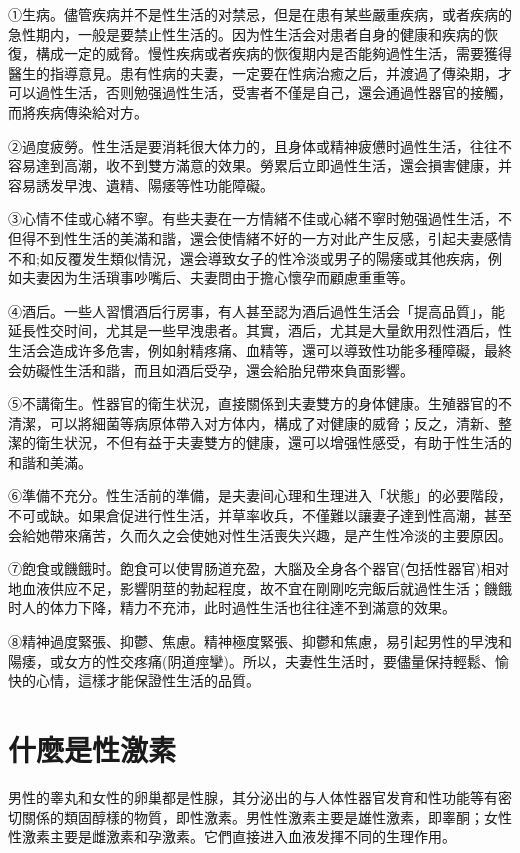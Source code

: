 \documentclass[12pt,UTF8]{ctexbook}
\begin{document}
①生病。儘管疾病并不是性生活的对禁忌，但是在患有某些嚴重疾病，或者疾病的急性期内，一般是要禁止性生活的。因为性生活会对患者自身的健康和疾病的恢復，構成一定的威脅。慢性疾病或者疾病的恢復期内是否能夠過性生活，需要獲得醫生的指導意見。患有性病的夫妻，一定要在性病治癒之后，并渡過了傳染期，才可以過性生活，否则勉强過性生活，受害者不僅是自己，還会通過性器官的接觸，而將疾病傳染給对方。

②過度疲勞。性生活是要消耗很大体力的，且身体或精神疲憊时過性生活，往往不容易達到高潮，收不到雙方滿意的效果。勞累后立即過性生活，還会損害健康，并容易誘发早洩、遺精、陽痿等性功能障礙。

③心情不佳或心緒不寧。有些夫妻在一方情緒不佳或心緒不寧时勉强過性生活，不但得不到性生活的美滿和諧，還会使情緒不好的一方对此产生反感，引起夫妻感情不和;如反覆发生類似情況，還会導致女子的性冷淡或男子的陽痿或其他疾病，例如夫妻因为生活瑣事吵嘴后、夫妻問由于擔心懷孕而顧慮重重等。

④酒后。一些人習慣酒后行房事，有人甚至認为酒后過性生活会「提高品質」，能延長性交时间，尤其是一些早洩患者。其實，酒后，尤其是大量飲用烈性酒后，性生活会造成许多危害，例如射精疼痛、血精等，還可以導致性功能多種障礙，最終会妨礙性生活和諧，而且如酒后受孕，還会給胎兒帶來負面影響。

⑤不講衛生。性器官的衛生状況，直接關係到夫妻雙方的身体健康。生殖器官的不清潔，可以將細菌等病原体帶入对方体内，構成了对健康的威脅；反之，清新、整潔的衛生状況，不但有益于夫妻雙方的健康，還可以增强性感受，有助于性生活的和諧和美滿。

⑥準備不充分。性生活前的準備，是夫妻间心理和生理进入「状態」的必要階段，不可或缺。如果倉促进行性生活，并草率收兵，不僅難以讓妻子達到性高潮，甚至会給她帶來痛苦，久而久之会使她对性生活喪失兴趣，是产生性冷淡的主要原因。

⑦飽食或饑餓时。飽食可以使胃肠道充盈，大腦及全身各个器官(包括性器官)相对地血液供应不足，影響阴莖的勃起程度，故不宜在剛剛吃完飯后就過性生活；饑餓时人的体力下降，精力不充沛，此时過性生活也往往達不到滿意的效果。

⑧精神過度緊張、抑鬱、焦慮。精神極度緊張、抑鬱和焦慮，易引起男性的早洩和陽痿，或女方的性交疼痛(阴道痙攣)。所以，夫妻性生活时，要儘量保持輕鬆、愉快的心情，這樣才能保證性生活的品質。

\section{什麼是性激素}

男性的睾丸和女性的卵巢都是性腺，其分泌出的与人体性器官发育和性功能等有密切關係的類固醇樣的物質，即性激素。男性性激素主要是雄性激素，即睾酮；女性性激素主要是雌激素和孕激素。它們直接进入血液发揮不同的生理作用。
\end{document}
